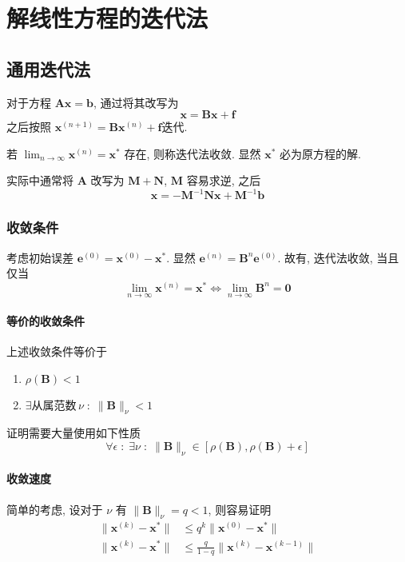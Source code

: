 \documentclass{ctexart}
\begin{document}
\section{解线性方程的迭代法}
\subsection{通用迭代法}
    对于方程 $\mathbf{A} \mathbf{x} = \mathbf{b} $, 通过将其改写为 \[
        \mathbf{x} = \mathbf{B} \mathbf{x} + \mathbf{f} \]
    之后按照 $\mathbf{x}^{(n+1)} = \mathbf{B} \mathbf{x}^{(n)} + \mathbf{f} $迭代.\par
    若 $\lim_{n\to\infty} \mathbf{x}^{(n)} = \mathbf{x}^*$ 存在, 则称迭代法收敛.
    显然 $\mathbf{x}^*$ 必为原方程的解.\par
    实际中通常将 $\mathbf{A}$ 改写为 $\mathbf{M} + \mathbf{N}$, $\mathbf{M}$ 容易求逆, 之后 \[
        \mathbf{x} = - \mathbf{M}^{-1} \mathbf{N} \mathbf{x} + \mathbf{M}^{-1} \mathbf{b} \]
\subsubsection{收敛条件}
    考虑初始误差 $\mathbf{e}^{(0)} = \mathbf{x}^{(0)} - \mathbf{x}^*$.
    显然 $\mathbf{e}^{(n)} = \mathbf{B}^n \mathbf{e}^{(0)}$.
    故有, 迭代法收敛, 当且仅当 \[
        \lim_{n\to\infty} \mathbf{x}^{(n)} = \mathbf{x}^* \Leftrightarrow %
        \lim_{n\to\infty} \mathbf{B}^n = \mathbf{0}\]
\paragraph{等价的收敛条件}
    上述收敛条件等价于 \begin{enumerate}
        \item $\rho(\mathbf{B}) < 1$
        \item $\exists \text{从属范数}\,\nu\;:\;\|\mathbf{B}\|_{\nu} < 1$
    \end{enumerate}
    证明需要大量使用如下性质 \[
        \forall \epsilon\;:\;\exists\nu\;:\;\|\mathbf{B}\|_{\nu} \in [\rho(\mathbf{B}), \rho(\mathbf{B})+\epsilon]\]
\paragraph{收敛速度}
    简单的考虑, 设对于 $\nu$ 有 $\|\mathbf{B}\|_{\nu} = q < 1$, 则容易证明 \begin{align*}
        \|\mathbf{x}^{(k)} - \mathbf{x} ^*\| &\le q^k \|\mathbf{x} ^{(0)} - \mathbf{x}^*\|\\
        \|\mathbf{x} ^{(k)} - \mathbf{x} ^*\| &\le \frac{q}{1-q} \| \mathbf{x}^{(k)} - \mathbf{x}^{(k-1)}\|
    \end{align*}
\end{document}
